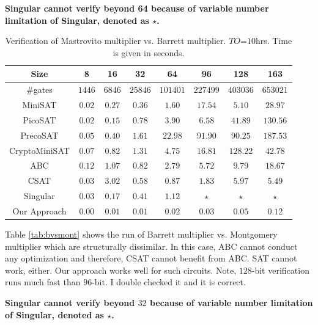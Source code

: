 {\bf Singular cannot verify beyond 64 because of variable number limitation of Singular, denoted as $\star$.}
{\small
\begin{table}[h!]
\begin{center}
\caption{\small Verification of Mastrovito multiplier vs. Barrett multiplier. $TO$=$10$hrs. Time is given in seconds.}
\label{tab:bvsmas}
\begin{tabular}{|c||c|c|c|c|c|c|c|} \hline 
Size   			&8  		&16       	&32       	&64      	&96   		&128  		&163		\\
\hline 
\#gates			&$1446$  	&$6846$    	&$25846$   	&$101401$    &$227499$  &$403036$  	&$653021$ 	\\
\hline
MiniSAT   		&$0.02$  	&$0.27$   	&$0.36$  	&$1.60$    	&$17.54$ 	&$5.10$ 	&$28.97$		\\
\hline
PicoSAT   		&$0.02$  	&$0.15$   	&$0.78$  	&$3.90$    	&$6.58$ 	&$41.89$ 	&$130.56$		\\
\hline
PrecoSAT   		&$0.05$  	&$0.40$   	&$1.61$  	&$22.98$   	&$91.90$ 	&$90.25$ 	&$187.53$		\\
\hline
CryptoMiniSAT	&$0.07$  	&$0.82$   	&$1.31$  	&$4.75$    	&$16.81$ 	&$128.22$ 	&$42.78$		\\
\hline
ABC   			&$0.12$  	&$1.07$   	&$0.82$  	&$2.79$    	&$5.72$ 	&$9.79$ 	&$18.67$	\\
\hline
CSAT   			&$0.03$  	&$3.02$   	&$0.58$  	&$0.87$   	&$1.83$ 	&$5.97$ 	&$5.49$		\\
\hline
Singular		&$0.03$  	&$0.17$   	&$0.41$  	&$1.12$   	&$\star$ 	&$\star$ 	&$\star$		\\
\hline
\hline
Our Approach	&$0.00$  	&$0.01$   	&$0.01$  	&$0.02$    &$0.03$  	&$0.05$  	&$0.12$ 	\\
\hline
\end{tabular}
\end{center}
\vspace{-0.2in}
\end{table}
}
Table \ref{tab:bvsmont} shows the run of Barrett multiplier vs. Montgomery multiplier which are structurally dissimilar. 
In this case, ABC cannot conduct any optimization and therefore, CSAT cannot benefit from ABC. SAT cannot work, either. 
Our approach works well for such circuits. Note, $128$-bit verification runs much fast than $96$-bit. 
I double checked it and it is correct.

{\bf Singular cannot verify beyond $32$  because of variable number limitation of Singular, denoted as $\star$.}

